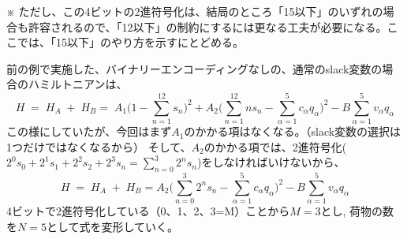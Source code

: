 \documentclass[uplatex,dvipdfmx,a4paper,11pt,oneside,openany]{jsbook}
\begin{document}
※ ただし、この4ビットの2進符号化は、結局のところ「15以下」のいずれの場合も許容されるので、「12以下」の制約にするには更なる工夫が必要になる。ここでは、「15以下」のやり方を示すにとどめる。

前の例で実施した、バイナリーエンコーディングなしの、通常のslack変数の場合のハミルトニアンは、
\[
  H\;=\;H_A\;+\;H_B
  =\;A_1\bigg(1-\sum_{n=1}^{12}s_n\bigg)^2 + A_2\bigg(\sum_{n=1}^{12}n s_n- \sum_{\alpha=1}^{5}c_\alpha q_\alpha\bigg)^2 - B\sum_{\alpha=1}^{5}v_\alpha q_\alpha
\]
この様にしていたが、今回はまず$A_1$のかかる項はなくなる。（slack変数の選択は1つだけではなくなるから）
そして、$A_2$のかかる項では、2進符号化($2^0 s_0 + 2^1 s_1 + 2^2 s_2 + 2^3 s_n=\sum_{n=0}^3 2^n s_n$)をしなければいけないから、
\[
  H\;=\;H_A\;+\;H_B
  =A_2\bigg(\sum_{n=0}^{3}2^n s_n- \sum_{\alpha=1}^{5}c_\alpha q_\alpha\bigg)^2 - B\sum_{\alpha=1}^{5}v_\alpha q_\alpha
\]
4ビットで2進符号化している（0、1、2、3=M）ことから$M=3$とし, 荷物の数を$N=5$として式を変形していく。
\end{document}
